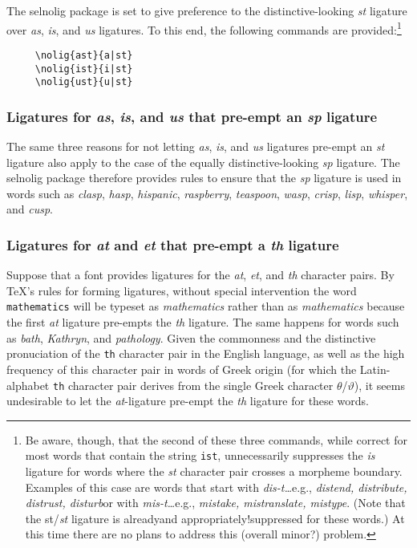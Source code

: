 \documentclass[11pt]{article}
\newcommand{\pkg}[1]{\textsf{#1}}
\newcommand{\opt}[1]{\texttt{#1}}
\begin{document}
The \pkg{selnolig} package is set to give preference to the distinctive-looking \emph{st} ligature over \emph{as}, \emph{is}, and \emph{us} ligatures. To this end, the following commands are provided:\footnote{Be aware, though, that the second of these three commands, while correct for most words that contain the string \opt{ist}, unnecessarily suppresses the \emph{is} ligature for words where the \emph{st} character pair crosses a morpheme boundary. Examples of this case are words that start with \emph{dis-t\ldots}\textemdash e.g., \emph{distend, distribute, distrust, disturb}\textemdash or with \emph{mis-t\ldots}\textemdash e.g., \emph{mistake, mistranslate, mistype}. (Note that the st/\emph{st} ligature is already\textemdash and appropriately!\textemdash suppressed for these words.) At this time there are no plans to address this (overall minor?) problem.}
\begin{Verbatim}
     \nolig{ast}{a|st}
     \nolig{ist}{i|st}
     \nolig{ust}{u|st}
\end{Verbatim}



\subsubsection*{Ligatures for \emph{as}, \emph{is}, and \emph{us} that pre-empt an \emph{sp} ligature}

The same three reasons for not letting \emph{as}, \emph{is}, and \emph{us} ligatures pre-empt an \emph{st} ligature also apply to the case of the equally distinctive-looking \emph{sp} ligature. The \pkg{selnolig} package therefore provides rules to ensure that the \emph{sp} ligature is used in words such as \emph{clasp}, \emph{hasp}, \emph{hispanic}, \emph{raspberry}, \emph{teaspoon}, \emph{wasp}, \emph{crisp}, \emph{lisp}, \emph{whisper}, and \emph{cusp}. 



\subsubsection*{Ligatures for \emph{at} and \emph{et} that pre-empt a \emph{th} ligature}

Suppose that a font provides ligatures for the \emph{at}, \emph{et}, and \emph{th} character pairs. By \TeX's rules for forming ligatures, without special intervention the word \opt{mathematics} will be typeset as \emph{m\mbox{at}hematics} rather than as \emph{mathematics} because the first \emph{at} ligature pre-empts the \emph{th} ligature. The same happens for words such as \emph{b\mbox{at}h}, \emph{K\mbox{at}hryn}, and \emph{p\mbox{at}hology}.
Given the commonness and the distinctive pronuciation of the \opt{th} character pair in the English language, as well as the high frequency of this character pair in words of Greek origin (for which the Latin-alphabet \opt{th} character pair derives from the single Greek character $\theta$/$\vartheta$), it seems undesirable to let the \emph{at}-ligature pre-empt the \emph{th} ligature for these words. 
\end{document}
